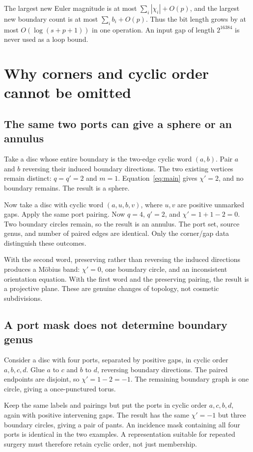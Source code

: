 \documentclass[11pt]{article}
\theoremstyle{definition}
\theoremstyle{remark}\newtheorem{remark}[theorem]{Remark}
\begin{document}
The largest new Euler magnitude is at most $\sum_i|\chi_i|+O(p)$, and the largest new boundary count is at most $\sum_i b_i+O(p)$. Thus the bit length grows by at most $O(\log(s+p+1))$ in one operation. An input gap of length $2^{16384}$ is never used as a loop bound.

\section{Why corners and cyclic order cannot be omitted}
\label{sec:examples}

\subsection{The same two ports can give a sphere or an annulus}
Take a disc whose entire boundary is the two-edge cyclic word $(a,b)$. Pair $a$ and $b$ reversing their induced boundary directions. The two existing vertices remain distinct: $q=q'=2$ and $m=1$. Equation~\eqref{eq:main} gives $\chi'=2$, and no boundary remains. The result is a sphere.

Now take a disc with cyclic word $(a,u,b,v)$, where $u,v$ are positive unmarked gaps. Apply the same port pairing. Now $q=4$, $q'=2$, and $\chi'=1+1-2=0$. Two boundary circles remain, so the result is an annulus. The port set, source genus, and number of paired edges are identical. Only the corner/gap data distinguish these outcomes.

With the second word, preserving rather than reversing the induced directions produces a M\"obius band: $\chi'=0$, one boundary circle, and an inconsistent orientation equation. With the first word and the preserving pairing, the result is a projective plane. These are genuine changes of topology, not cosmetic subdivisions.

\subsection{A port mask does not determine boundary genus}
Consider a disc with four ports, separated by positive gaps, in cyclic order $a,b,c,d$. Glue $a$ to $c$ and $b$ to $d$, reversing boundary directions. The paired endpoints are disjoint, so $\chi'=1-2=-1$. The remaining boundary graph is one circle, giving a once-punctured torus.

Keep the same labels and pairings but put the ports in cyclic order $a,c,b,d$, again with positive intervening gaps. The result has the same $\chi'=-1$ but three boundary circles, giving a pair of pants. An incidence mask containing all four ports is identical in the two examples. A representation suitable for repeated surgery must therefore retain cyclic order, not just membership.
\end{document}
